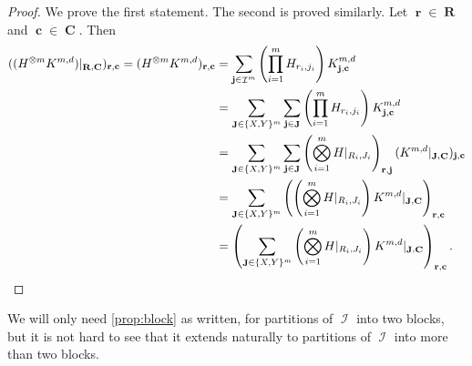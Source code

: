 \documentclass{article}
\DeclareMathOperator{\vr}{\mathbf{R}}
\DeclareMathOperator{\vrr}{\mathbf{r}}
\DeclareMathOperator{\vc}{\mathbf{C}}
\DeclareMathOperator{\vcc}{\mathbf{c}}
\DeclareMathOperator{\vj}{\mathbf{J}}
\DeclareMathOperator{\vjj}{\mathbf{j}}
\DeclareMathOperator{\ic}{\mathcal{I}}
\begin{document}
\begin{proof}
    We prove the first statement. The second is proved similarly.
    Let $\vrr \in \vr$ and $\vcc \in \vc$. Then
    \begin{align*}
        ((H^{\otimes m} K^{m,d})|_{\vr,\vc})_{\vrr,\vcc}
        = (H^{\otimes m} K^{m,d})_{\vrr,\vcc}
        &= \sum_{\vjj\in\ic^m} \left(\prod_{i=1}^m H_{r_i,j_i}\right)K^{m,d}_{\vjj,\vcc}\\
        &= \sum_{\vj\in\{X,Y\}^m} \sum_{\vjj\in\vj} \left(\prod_{i=1}^m H_{r_i,j_i}\right)K^{m,d}_{\vjj,\vcc}\\
        &= \sum_{\vj \in \{X,Y\}^m} \sum_{\vjj\in\vj}\left(\bigotimes_{i=1}^m H|_{R_i,J_i}\right)_{\vrr,\vjj} (K^{m,d}|_{\vj,\vc})_{\vjj,\vcc}\\
        &= \sum_{\vj \in \{X,Y\}^m} \left(\left(\bigotimes_{i=1}^m H|_{R_i,J_i}\right) K^{m,d}|_{\vj,\vc}\right)_{\vrr,\vcc} \\
        &= \left(\sum_{\vj \in \{X,Y\}^m} \left(\bigotimes_{i=1}^m H|_{R_i,J_i}\right) K^{m,d}|_{\vj,\vc}\right)_{\vrr,\vcc}. \qedhere
    \end{align*}
\end{proof}
We will only need \autoref{prop:block} as written, for partitions of $\ic$ into two blocks, but it is
not hard to see that it extends naturally to partitions of $\ic$ into more than two blocks.
\end{document}
